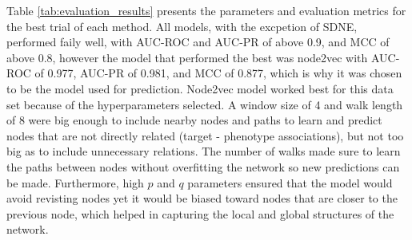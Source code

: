 Table \ref{tab:evaluation_results} presents the parameters and evaluation metrics for the best trial of each method. All models, with the excpetion of \ac{SDNE}, performed faily well, with AUC-ROC and AUC-PR of above 0.9, and MCC of above 0.8, however the model that performed the best was node2vec with AUC-ROC of 0.977, AUC-PR of 0.981, and \ac{MCC} of 0.877, which is why it was chosen to be the model used for prediction. Node2vec model worked best for this data set because of the hyperparameters selected. A window size of 4 and walk length of 8 were big enough to include nearby nodes and paths to learn and predict nodes that are not directly related (target - phenotype associations), but not too big as to include unnecessary relations. The number of walks made sure to learn the paths between nodes without overfitting the network so new predictions can be made. Furthermore, high $p$ and $q$ parameters ensured that the model would avoid revisting nodes yet it would be biased toward nodes that are closer to the previous node, which helped in capturing the local and global structures of the network.


